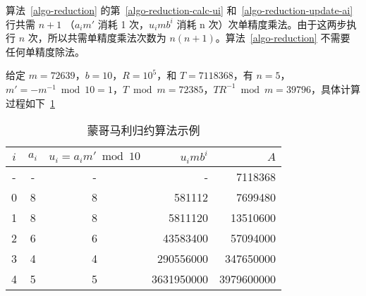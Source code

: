 \begin{note}[蒙哥马利归约的计算效率]
  算法~\ref{algo-reduction} 的第~\ref{algo-reduction-calc-ui} 和~\ref{algo-reduction-update-ai}
  行共需 \(n+1\) （\(a_im'\) 消耗 1 次，\(u_imb^i\) 消耗 n 次）次单精度乘法。由于这两步执行
  \(n\) 次，所以共需单精度乘法次数为 \(n(n+1)\)。算法~\ref{algo-reduction} 不需要
  任何单精度除法。
\end{note}

\begin{example}[蒙哥马利归约]
  给定 \(m=72639\)，\(b=10\)，\(R=10^5\)，和 \(T=7118368\)，有 \(n=5\)，\(m'=-m^{-1}\bmod 10=1\)，\(T\bmod m=72385\)，\(TR^{-1}\bmod m=39796\)，具体计算过程如下\tablename~\ref{montgomery-reduction-example}

  \begin{table}[!htbp]
    \centering
    \begin{tabular}{|c|c|c|r|r|}
      \hline 
      \(i\) & \(a_i\) & \(u_i=a_im'\bmod 10\) & \(u_imb^i\) & \(A\) \\
      \hline
      - & - & - & - & 7118368 \\
      0 &8 &8 &581112 &7699480 \\
      1 &8 &8 &5811120 &13510600 \\
      2 &6 &6 &43583400 &57094000 \\
      3 &4 &4 &290556000 &347650000 \\
      4 &5 &5 &3631950000 &3979600000 \\
      \hline 
    \end{tabular} 
    \caption{蒙哥马利归约算法示例}\label{montgomery-reduction-example}
  \end{table}
\end{example}